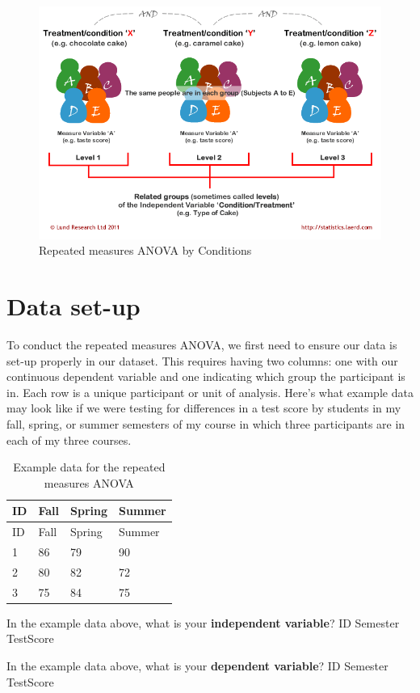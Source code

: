 \documentclass[
]{book}
\begin{document}
\begin{figure}

{\centering \includegraphics[width=0.8\linewidth]{images/05-repeated-measures-anova/Laerd2} 

}

\caption{Repeated measures ANOVA by Conditions}\label{fig:unnamed-chunk-2}
\end{figure}

\hypertarget{data-set-up-6}{%
\section{Data set-up}\label{data-set-up-6}}

To conduct the repeated measures ANOVA, we first need to ensure our data is set-up properly in our dataset. This requires having two columns: one with our continuous dependent variable and one indicating which group the participant is in. Each row is a unique participant or unit of analysis. Here's what example data may look like if we were testing for differences in a test score by students in my fall, spring, or summer semesters of my course in which three participants are in each of my three courses.

\begin{longtable}[]{@{}llll@{}}
\caption{Example data for the repeated measures ANOVA}\tabularnewline
\toprule
ID & Fall & Spring & Summer\tabularnewline
\midrule
\endfirsthead
\toprule
ID & Fall & Spring & Summer\tabularnewline
\midrule
\endhead
1 & 86 & 79 & 90\tabularnewline
2 & 80 & 82 & 72\tabularnewline
3 & 75 & 84 & 75\tabularnewline
\bottomrule
\end{longtable}

In the example data above, what is your \textbf{independent variable}? ID Semester TestScore

In the example data above, what is your \textbf{dependent variable}? ID Semester TestScore
\end{document}
